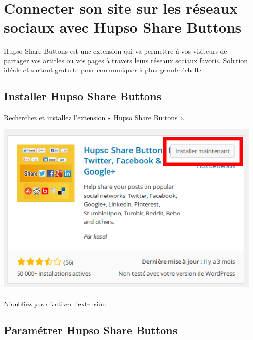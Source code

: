 \documentclass[10pt,a4paper]{article}
\begin{document}
\section{Connecter son site sur les réseaux sociaux avec Hupso Share Buttons}
\paragraph{}Hupso Share Buttons est une extension qui va permettre à vos visiteurs de partager vos articles ou vos pages à travers leurs réseaux sociaux favoris. Solution idéale et surtout gratuite pour communiquer à plus grande échelle.
\subsection{Installer Hupso Share Buttons}
\paragraph{}Recherchez et installez l'extension « Hupso Share Buttons ».
\begin{center}
\includegraphics[scale=0.3]{img/0175.png}
\end{center}
\paragraph{}N'oubliez pas d'activer l'extension.
\subsection{Paramétrer Hupso Share Buttons}
\end{document}
